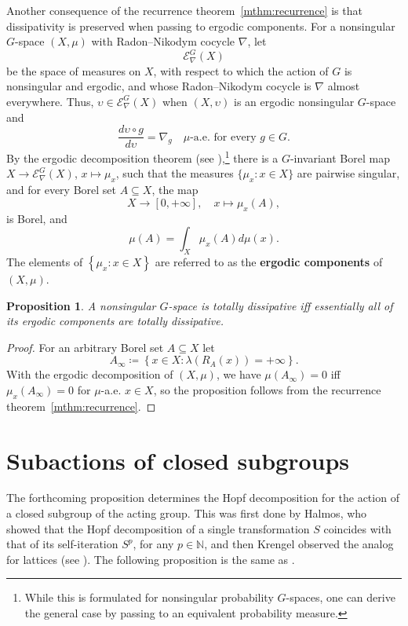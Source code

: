 \documentclass{amsart}
\numberwithin{equation}{subsection}
\newtheorem{prop}[thm]{Proposition}
\begin{document}
Another consequence of the recurrence theorem~\ref{mthm:recurrence} is that dissipativity is preserved when passing to ergodic components. For a nonsingular \(G\)-space \(\left(X,\mu\right)\) with Radon--Nikodym cocycle \(\nabla\), let 
\[\mathcal{E}_{\nabla}^{G}\left(X\right)\]
be the space of measures on \(X\), with respect to which the action of \(G\) is nonsingular and ergodic, and whose Radon--Nikodym cocycle is \(\nabla\) almost everywhere. Thus, \(\upsilon\in\mathcal{E}_{\nabla}^{G}\left(X\right)\) when \(\left(X,\upsilon\right)\) is an ergodic nonsingular \(G\)-space and
\[\frac{d\upsilon\circ g}{d\upsilon}=\nabla_{g}\quad\mu\text{-a.e. for every }g\in G.\]
By the ergodic decomposition theorem (see \cite[Theorem 1.1 \& 5.2]{greschonig2000ergodic}),\footnote{While this is formulated for nonsingular probability \(G\)-spaces, one can derive the general case by passing to an equivalent probability measure.} there is a \(G\)-invariant Borel map \(X\to\mathcal{E}_{\nabla}^{G}\left(X\right)\), \(x\mapsto\mu_{x}\), such that the measures \(\{\mu_{x}:x\in X\}\) are pairwise singular, and for every Borel set \(A\subseteq X\), the map
\[X\to\left[0,+\infty\right],\quad x\mapsto\mu_{x}\left(A\right),\]
is Borel, and 
\[\mu\left(A\right)=\int_{X}\mu_{x}\left(A\right)d\mu\left(x\right).\]
The elements of \(\left\{\mu_{x}:x\in X\right\}\) are referred to as the {\bf ergodic components} of \(\left(X,\mu\right)\).

\begin{prop}
\label{prop:dissergodicdeco}
A nonsingular \(G\)-space is totally dissipative iff essentially all of its ergodic components are totally dissipative.
\end{prop}

\begin{proof}
For an arbitrary Borel set \(A\subseteq X\) let
\[A_{\infty}\coloneqq \left\{x\in X:\lambda\left(R_{A}\left(x\right)\right)=+\infty\right\}.\]
With the ergodic decomposition of \(\left(X,\mu\right)\), we have \(\mu\left(A_{\infty}\right)=0\) iff \(\mu_{x}\left(A_{\infty}\right)=0\) for \(\mu\)-a.e. \(x\in X\), so the proposition follows from the recurrence theorem~\ref{mthm:recurrence}.
\end{proof}

\section{Subactions of closed subgroups}

The forthcoming proposition determines the Hopf decomposition for the action of a closed subgroup of the acting group. This was first done by Halmos, who showed that the Hopf decomposition of a single transformation \(S\) coincides with that of its self-iteration \(S^{p}\), for any \(p\in\mathbb{N}\), and then Krengel observed the analog for lattices \cite[Lemma 2.7]{krengel1969II} (see \cite[Corollary 1.1.4 \& Theorem 1.6.4]{aaronson1997introduction}). The following proposition is the same as \cite[Proposition 4.36]{arano2021ergodic}.
\end{document}
